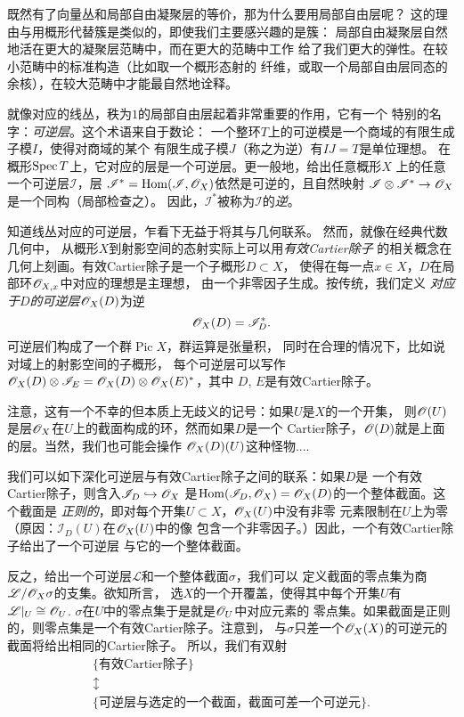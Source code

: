 既然有了向量丛和局部自由凝聚层的等价，那为什么要用局部自由层呢？
这的理由与用概形代替簇是类似的，即使我们主要感兴趣的是簇：
局部自由凝聚层自然地活在更大的凝聚层范畴中，而在更大的范畴中工作
给了我们更大的弹性。在较小范畴中的标准构造（比如取一个概形态射的
纤维，或取一个局部自由层同态的余核），在较大范畴中才能最自然地诠释。

就像对应的线丛，秩为$1$的局部自由层起着非常重要的作用，它有一个
特别的名字：\textit{可逆层}。这个术语来自于数论：
一个整环$T$上的可逆模是一个商域的有限生成子模$I$，使得对商域的某个
有限生成子模$J$（称之为逆）有$IJ=T$是单位理想。%
在概形$\operatorname{Spec} T$上，它对应的层是一个可逆层。更一般地，给出任意概形$X$
上的任意一个可逆层$\mathscr I$，层
$\mathscr I^*=\operatorname{Hom}(\mathscr I,\mathscr{O}_X)$依然是可逆的，且自然映射
$\mathscr I\otimes \mathscr I^*\to \mathscr{O}_X$是一个同构（局部检查之）。
因此，$\mathscr I^*$被称为$\mathscr I$的\textit{逆}。

知道线丛对应的可逆层，乍看下无益于将其与几何联系。
然而，就像在经典代数几何中，
从概形$X$到射影空间的态射实际上可以用\textit{有效Cartier除子}
的相关概念在几何上刻画。有效Cartier除子是一个子概形$D\subset X$，
使得在每一点$x\in X$，$D$在局部环$\mathscr{O}_{X,x}$中对应的理想是主理想，
由一个非零因子生成。按传统，我们定义
\textit{对应于$D$的可逆层$\mathscr{O}_X(D)$}为逆
\[
	\mathscr{O}_X(D)=\mathscr I_D^*.
\]
可逆层们构成了一个群$\operatorname{Pic} X$，群运算是张量积，
同时在合理的情况下，比如说对域上的射影空间的子概形，
每个可逆层可以写作
$\mathscr{O}_X(D)\otimes \mathscr I_E=\mathscr{O}_X(D)\otimes \mathscr{O}_X(E)^*$，其中
$D$, $E$是有效Cartier除子。

注意，这有一个不幸的但本质上无歧义的记号：如果$U$是$X$的一个开集，
则$\mathscr{O}(U)$是层$\mathscr{O}_X$在$U$上的截面构成的环，然而如果$D$是一个
Cartier除子，$\mathscr{O}(D)$就是上面的层。当然，我们也可能会操作
$\mathscr{O}_X(D)(U)$这种怪物....

我们可以如下深化可逆层与有效Cartier除子之间的联系：如果$D$是
一个有效Cartier除子，则含入$\mathscr I_D\hookrightarrow \mathscr{O}_X$
是$\operatorname{Hom}(\mathscr I_D,\mathscr{O}_X)=\mathscr{O}_X(D)$的一个整体截面。这个截面是
\textit{正则的}，即对每个开集$U\subset X$，$\mathscr{O}_X(U)$中没有非零
元素限制在$U$上为零（原因：$\mathscr I_D(U)$在$\mathscr{O}_X(U)$中的像
包含一个非零因子。）因此，一个有效Cartier除子给出了一个可逆层
与它的一个整体截面。

反之，给出一个可逆层$\mathscr L$和一个整体截面$\sigma$，我们可以
定义截面的零点集为商$\mathscr L/\mathscr{O}_X\sigma$的支集。欲知所言，
选$X$的一个开覆盖，使得其中每个开集$U$有$\mathscr L|_{U}
\cong \mathscr{O}_U$. $\sigma$在$U$中的零点集于是就是$\mathscr{O}_U$中对应元素的
零点集。如果截面是正则的，则零点集是一个有效Cartier除子。注意到，
与$\sigma$只差一个$\mathscr{O}_X(X)$的可逆元的截面将给出相同的Cartier除子。
所以，我们有双射
\[
	\begin{array}{c}
	\{\text{有效Cartier除子}\}\\
	\updownarrow \\
	\{\text{可逆层与选定的一个截面，截面可差一个可逆元}\}.
	\end{array}
\]

